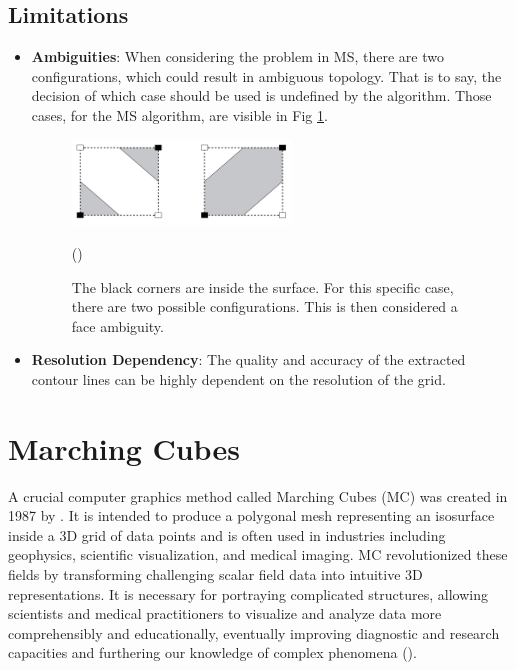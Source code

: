 \subsection{Limitations}
\begin{itemize}
\item \textbf{Ambiguities}: When considering the problem in MS, there are two configurations, which could result in ambiguous topology. That is to say, the decision of which case should be used is undefined by the algorithm. Those cases, for the MS algorithm, are visible in Fig \ref{fig:ambiguity}.

\begin{figure}[H]
\centering
\includegraphics[height=0.26\textwidth,width=0.55\textwidth]{Figures/ambiguity.jpg}
\decoRule
\caption{The black corners are inside the surface. For this specific case, there are two possible configurations. This is then considered a face ambiguity.} (\cite{Chien-Chang_2005})
\label{fig:ambiguity}
\end{figure}

\item \textbf{Resolution Dependency}: The quality and accuracy of the extracted contour lines can be highly dependent on the resolution of the grid.
\end{itemize}

\section{Marching Cubes} \label{Marching-Cubes}

A crucial computer graphics method called Marching Cubes (MC) was created in 1987 by \cite{Lorensen_1987}. It is intended to produce a polygonal mesh representing an isosurface inside a 3D grid of data points and is often used in industries including geophysics, scientific visualization, and medical imaging. MC revolutionized these fields by transforming challenging scalar field data into intuitive 3D representations. It is necessary for portraying complicated structures, allowing scientists and medical practitioners to visualize and analyze data more comprehensibly and educationally, eventually improving diagnostic and research capacities and furthering our knowledge of complex phenomena (\cite{Lorensen_1987}).

